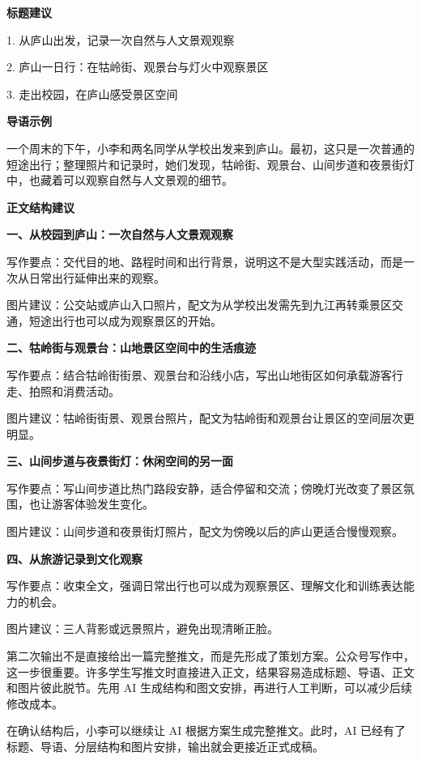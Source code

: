 \begin{aibox}
\textbf{标题建议}

1. 从庐山出发，记录一次自然与人文景观观察

2. 庐山一日行：在牯岭街、观景台与灯火中观察景区

3. 走出校园，在庐山感受景区空间

\textbf{导语示例}

一个周末的下午，小李和两名同学从学校出发来到庐山。最初，这只是一次普通的短途出行；整理照片和记录时，她们发现，牯岭街、观景台、山间步道和夜景街灯中，也藏着可以观察自然与人文景观的细节。

\textbf{正文结构建议}

\textbf{一、从校园到庐山：一次自然与人文景观观察}

写作要点：交代目的地、路程时间和出行背景，说明这不是大型实践活动，而是一次从日常出行延伸出来的观察。

图片建议：公交站或庐山入口照片，配文为从学校出发需先到九江再转乘景区交通，短途出行也可以成为观察景区的开始。

\textbf{二、牯岭街与观景台：山地景区空间中的生活痕迹}

写作要点：结合牯岭街街景、观景台和沿线小店，写出山地街区如何承载游客行走、拍照和消费活动。

图片建议：牯岭街街景、观景台照片，配文为牯岭街和观景台让景区的空间层次更明显。

\textbf{三、山间步道与夜景街灯：休闲空间的另一面}

写作要点：写山间步道比热门路段安静，适合停留和交流；傍晚灯光改变了景区氛围，也让游客体验发生变化。

图片建议：山间步道和夜景街灯照片，配文为傍晚以后的庐山更适合慢慢观察。

\textbf{四、从旅游记录到文化观察}

写作要点：收束全文，强调日常出行也可以成为观察景区、理解文化和训练表达能力的机会。

图片建议：三人背影或远景照片，避免出现清晰正脸。
\end{aibox}

第二次输出不是直接给出一篇完整推文，而是先形成了策划方案。公众号写作中，这一步很重要。许多学生写推文时直接进入正文，结果容易造成标题、导语、正文和图片彼此脱节。先用 AI 生成结构和图文安排，再进行人工判断，可以减少后续修改成本。

在确认结构后，小李可以继续让 AI 根据方案生成完整推文。此时，AI 已经有了标题、导语、分层结构和图片安排，输出就会更接近正式成稿。

